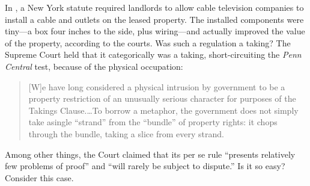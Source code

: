 

In \optclause, a New York statute required landlords to allow
cable television companies to install a cable and outlets on the leased
property. The installed components were tiny---a box four inches to the side,
plus wiring---and actually improved the value of the property, according to the
courts. Was such a regulation a taking? The Supreme Court held that it
categorically was a taking, short-circuiting the \emph{Penn Central} test,
because of the physical occupation:
\begin{quote}
[W]e have long considered a physical intrusion by government to be a property
restriction of an unusually serious character for purposes of the Takings
Clause.\ldots To borrow a metaphor, the government does not simply take asingle
``strand'' from the ``bundle'' of property rights: it chops through the bundle,
taking a slice from every strand.
\end{quote}
Among other things, the Court claimed that its per se rule ``presents relatively
few problems of proof'' and ``will rarely be subject to dispute.'' Is it so
easy? Consider this case.

